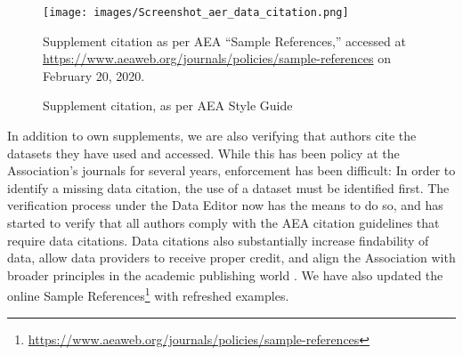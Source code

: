 \documentclass[PP]{AEA}
\newcommand{\urlcite}[2]{#2\footnote{\url{#1}}}
\begin{document}
\begin{figure}
    \texttt{[image: images/Screenshot\_aer\_data\_citation.png]}
    \caption{Supplement citation, as per AEA Style Guide\label{fig:citation}}
    \begin{minipage}{0.5\linewidth}
      \footnotesize  Supplement citation as per AEA ``Sample References,'' accessed at \url{https://www.aeaweb.org/journals/policies/sample-references} on February 20, 2020.
    \end{minipage}
\end{figure}

In addition to own supplements, we are also verifying that authors cite the datasets they have used and accessed. While this has been policy at the Association's journals for several years, enforcement has been difficult: In order to identify a missing data citation, the use of a dataset must be identified first. The verification process under the Data Editor now has the means to do so, and has started to verify that all authors comply with the AEA citation guidelines that require data citations. Data citations also substantially increase findability of data, allow data providers to receive proper credit, and align the Association with broader principles in the academic publishing world \citep{Altman2013-fl,dataone-cite,jddcp,CousijnSci.Data2018}. We have also updated the online  \urlcite{https://www.aeaweb.org/journals/policies/sample-references}{Sample References} with refreshed examples.
\end{document}
